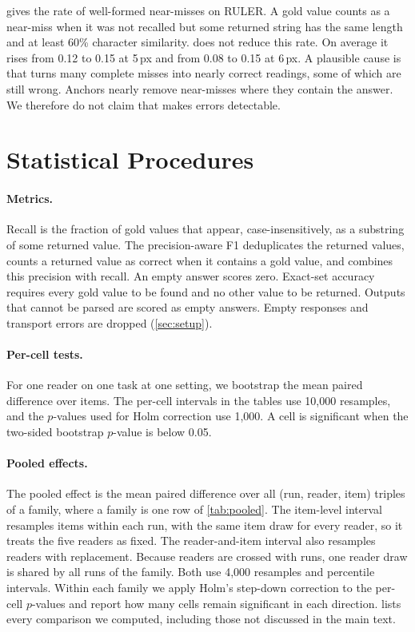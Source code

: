 

 gives the rate of well-formed near-misses on RULER.
A gold value counts as a near-miss when it was not recalled but some returned string has the same length and at least 60\% character similarity.
\name does not reduce this rate.
On average it rises from 0.12 to 0.15 at 5\,px and from 0.08 to 0.15 at 6\,px.
A plausible cause is that \name turns many complete misses into nearly correct readings, some of which are still wrong.
Anchors nearly remove near-misses where they contain the answer.
We therefore do not claim that \name makes errors detectable.



\section{Statistical Procedures}
\label{app:stats}

\paragraph{Metrics.}
Recall is the fraction of gold values that appear, case-insensitively, as a substring of some returned value.
The precision-aware F1 deduplicates the returned values, counts a returned value as correct when it contains a gold value, and combines this precision with recall.
An empty answer scores zero.
Exact-set accuracy requires every gold value to be found and no other value to be returned.
Outputs that cannot be parsed are scored as empty answers.
Empty responses and transport errors are dropped (\cref{sec:setup}).

\paragraph{Per-cell tests.}
For one reader on one task at one setting, we bootstrap the mean paired difference over items.
The per-cell intervals in the tables use 10{,}000 resamples, and the $p$-values used for Holm correction use 1{,}000.
A cell is significant when the two-sided bootstrap $p$-value is below 0.05.

\paragraph{Pooled effects.}
The pooled effect is the mean paired difference over all (run, reader, item) triples of a family, where a family is one row of \cref{tab:pooled}.
The item-level interval resamples items within each run, with the same item draw for every reader, so it treats the five readers as fixed.
The reader-and-item interval also resamples readers with replacement.
Because readers are crossed with runs, one reader draw is shared by all runs of the family.
Both use 4{,}000 resamples and percentile intervals.
Within each family we apply Holm's step-down correction to the per-cell $p$-values and report how many cells remain significant in each direction.
 lists every comparison we computed, including those not discussed in the main text.

